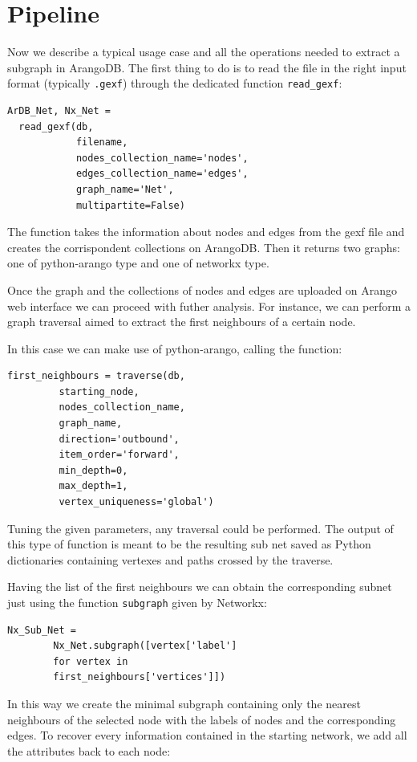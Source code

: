 \documentclass[11pt,twocolumn]{article}
\begin{document}
\section{Pipeline}
Now we describe a typical usage case and all the operations needed to extract a subgraph in ArangoDB.
The first thing to do is to read the file in the right input format (typically \texttt{.gexf}) through the dedicated function \texttt{read\_gexf}:

\begin{verbatim}
ArDB_Net, Nx_Net =
  read_gexf(db,
            filename,
            nodes_collection_name='nodes',
            edges_collection_name='edges',
            graph_name='Net',
            multipartite=False)
\end{verbatim}

The function takes the information about nodes and edges from the gexf file and creates the corrispondent collections on ArangoDB.
Then it returns two graphs: one of python-arango type and one of networkx type.

Once the graph and the collections of nodes and edges are uploaded on Arango web interface we can proceed with futher analysis. For instance, we can perform a graph traversal aimed to extract the first neighbours of a certain node.

In this case we can make use of python-arango, calling the function:

\begin{verbatim}
first_neighbours = traverse(db,
         starting_node,
         nodes_collection_name,
         graph_name,
         direction='outbound',
         item_order='forward',
         min_depth=0,
         max_depth=1,
         vertex_uniqueness='global')
\end{verbatim}

Tuning the given parameters, any traversal could be performed. The output of this type of function is meant to be the resulting sub net saved as Python dictionaries containing vertexes and paths crossed by the traverse.

Having the list of the first neighbours we can obtain the corresponding subnet just using the function \texttt{subgraph} given by Networkx:

\begin{verbatim}
Nx_Sub_Net =
        Nx_Net.subgraph([vertex['label']
        for vertex in
        first_neighbours['vertices']])
\end{verbatim}

In this way we create the minimal subgraph containing only the nearest neighbours of the selected node with the labels of nodes and the corresponding edges.
To recover every information contained in the starting network, we add all the attributes back to each node:
\end{document}
